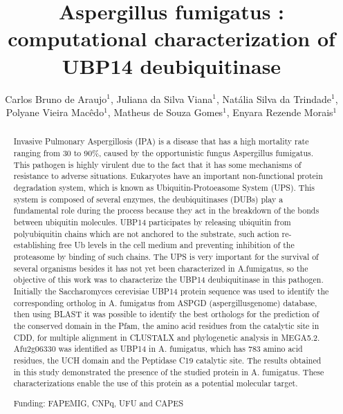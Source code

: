 \documentclass[twoside]{article}
\title{\vspace{-15mm}\fontsize{24pt}{10pt}\selectfont\textbf{Aspergillus fumigatus : computational characterization of  UBP14 deubiquitinase}} %
\author{Carlos Bruno de Araujo$^1$, Juliana da Silva Viana$^1$, Nat\'alia Silva da Trindade$^1$, Polyane Vieira Mac\^edo$^1$, Matheus de Souza Gomes$^1$, Enyara Rezende Morais$^1$}
\affil{1 UFU\\ }
\date{}
\begin{document}
\maketitle %

\thispagestyle{fancy} %


\begin{abstract}
Invasive Pulmonary Aspergillosis (IPA) is a disease that has a high mortality rate ranging from 30 to 90\%, caused by the opportunistic fungus Aspergillus fumigatus. This pathogen is highly virulent due to the fact that it has some mechanisms of resistance to adverse situations. Eukaryotes have an important non-functional protein degradation system, which is known as Ubiquitin-Protoeasome System (UPS). This system is composed of several enzymes, the deubiquitinases (DUBs) play a fundamental role during the process because they act in the breakdown of the bonds between ubiquitin molecules. UBP14 participates by releasing ubiquitin from polyubiquitin chains which are not anchored to the substrate, such action re-establishing free Ub levels in the cell medium and preventing inhibition of the proteasome by binding of such chains. The UPS is very important for the survival of several organisms besides it has not yet been characterized in A.fumigatus, so the objective of this work was to characterize the UBP14 deubiquitinase in this pathogen. Initially the Saccharomyces cerevisiae UBP14 protein sequence was used to identify the corresponding ortholog in A. fumigatus from ASPGD (aspergillusgenome) database, then using BLAST it was possible to identify the best orthologs for the prediction of the conserved domain in the Pfam, the amino acid residues from the catalytic site in CDD, for multiple alignment in CLUSTALX and phylogenetic analysis in MEGA5.2. Afu2g06330 was identified as UBP14 in A. fumigatus, which has 783 amino acid residues, the UCH domain and the Peptidase C19 catalytic site. The results obtained in this study demonstrated the presence of the studied protein in A. fumigatus. These characterizations enable the use of this protein as a potential molecular target.

Funding: FAPEMIG, CNPq, UFU and CAPES
\end{abstract}
\end{document}
